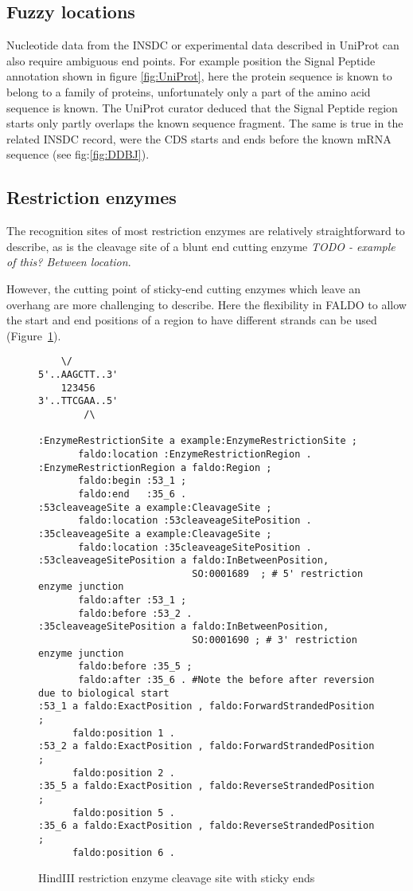 \subsection*{Fuzzy locations}
Nucleotide data from the INSDC or experimental data described in UniProt can also require ambiguous end points. 
For example position the Signal Peptide annotation shown in figure \ref{fig:UniProt}, 
here the protein sequence is known to belong to a family of proteins, unfortunately only a part of the amino acid sequence is known. 
The UniProt curator deduced that the Signal Peptide region starts only partly overlaps the known sequence fragment.
The same is true in the related INSDC record, were the CDS starts and ends before the known mRNA sequence (see fig:\ref{fig:DDBJ}).

\subsection*{Restriction enzymes}

The recognition sites of most restriction enzymes are relatively
straightforward to describe, as is the cleavage site of a blunt
end cutting enzyme \textit{TODO - example of this? Between location}.

However, the cutting point of sticky-end cutting enzymes which
leave an overhang are more challenging to describe. Here the
flexibility in FALDO to allow the start and end positions of a region
to have different strands can be used (Figure~\ref{fig:HindIII}).

\begin{figure}
\begin{shaded}
\small
\begin{verbatim}
    \/
5'..AAGCTT..3' 
    123456
3'..TTCGAA..5'
        /\
        
:EnzymeRestrictionSite a example:EnzymeRestrictionSite ;
       faldo:location :EnzymeRestrictionRegion .
:EnzymeRestrictionRegion a faldo:Region ;
       faldo:begin :53_1 ;
       faldo:end   :35_6 .
:53cleaveageSite a example:CleavageSite ;
       faldo:location :53cleaveageSitePosition .
:35cleaveageSite a example:CleavageSite ;
       faldo:location :35cleaveageSitePosition .
:53cleaveageSitePosition a faldo:InBetweenPosition, 
                           SO:0001689  ; # 5' restriction enzyme junction 
       faldo:after :53_1 ;        
       faldo:before :53_2 .
:35cleaveageSitePosition a faldo:InBetweenPosition, 
                           SO:0001690 ; # 3' restriction enzyme junction 
       faldo:before :35_5 ;
       faldo:after :35_6 . #Note the before after reversion due to biological start      
:53_1 a faldo:ExactPosition , faldo:ForwardStrandedPosition ;
      faldo:position 1 .
:53_2 a faldo:ExactPosition , faldo:ForwardStrandedPosition ;
      faldo:position 2 .
:35_5 a faldo:ExactPosition , faldo:ReverseStrandedPosition ;
      faldo:position 5 .
:35_6 a faldo:ExactPosition , faldo:ReverseStrandedPosition ;
      faldo:position 6 .
\end{verbatim}
\end{shaded}
\caption{HindIII restriction enzyme cleavage site with sticky ends}
\label{fig:HindIII}
\end{figure}


